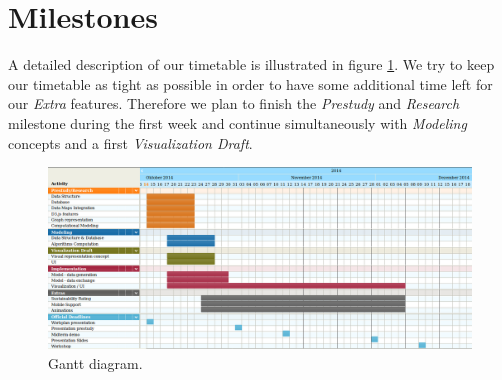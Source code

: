 \documentclass[a4page]{article}
\begin{document}
\section{Milestones}

A detailed description of our timetable is illustrated in figure \ref{fig:gant-diagram}. We try to keep our timetable as tight as possible in order to have some additional time left for our \textit{Extra} features. Therefore we plan to finish the \textit{Prestudy} and \textit{Research} milestone during the first week and continue simultaneously with \textit{Modeling} concepts and a first \textit{Visualization Draft}. 

\begin{figure}[ht]
 \centering
 \includegraphics[scale=0.5]{gantt.png}
 \caption{Gantt diagram.}
 \label{fig:gant-diagram}
\end{figure}




\end{document}
